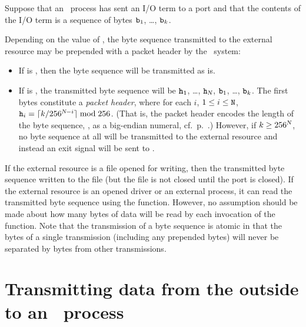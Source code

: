 \label{section:send-port}
\label{section:packets}

Suppose that an \Erlang\ process has sent an I/O term  to a port  and that
the contents of the I/O term is a sequence of bytes ${\tt{\sl b}}_1$, \ldots, ${\tt{\sl b}}_k$.

Depending on the value of
,
the byte sequence transmitted to the
external resource may be prepended with a packet header by the \Erlang\ system:
\begin{itemize}
\item {}
If  is , then the byte sequence will be transmitted
as is.
\item {}
If  is , the transmitted byte sequence
will be ${\tt{\sl h}}_1$, \ldots, ${\tt{\sl h}}_{\mbox{\scriptsize\tt{\sl{N}}}}$, ${\tt{\sl b}}_1$, \ldots, ${\tt{\sl b}}_k$.
The first  bytes constitute a \emph{packet header}, where for each $i$,
$1\leq i\leq{\tt{\sl N}}$, ${\tt{\sl h}}_i=\lceil k/256^{\mbox{\scriptsize\tt{\sl{N}}}-i}\rceil \bmod 256$.
(That is, the packet header encodes the length of the byte sequence, ,
as a big-endian numeral, cf.\ p.~\pageref{page:big-endian}.)
However, if $k\geq256^{\mbox{\scriptsize\tt{\sl{N}}}}$, no byte sequence at all will be transmitted to the
external resource and instead an exit signal
 will be sent to .
\end{itemize}
If the external resource is a file opened for writing, then the transmitted byte sequence
written to the file (but the file is not closed until the port is closed).
If the external resource is an opened driver or an external process, it can read the transmitted
byte sequence using the  function.
However, no
assumption should
be made about how many bytes of data will be read by each invocation of the 
function.
Note that the transmission of a byte sequence is atomic in that the bytes of a single
transmission (including any
prepended bytes) will never be separated by bytes from other transmissions.

\section{Transmitting data from the outside to an \Erlang\ process}


